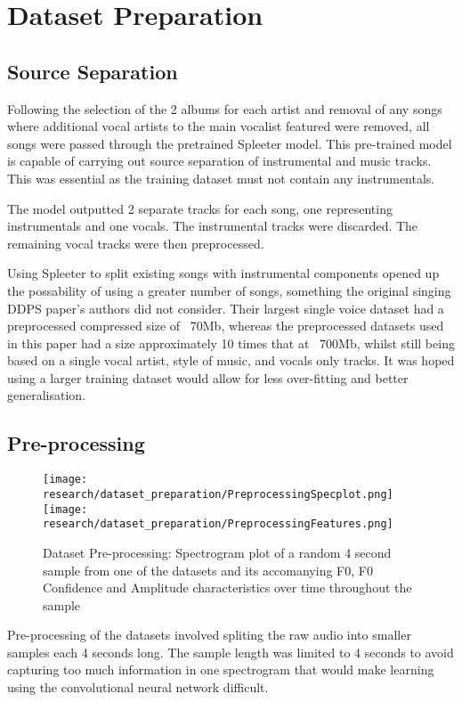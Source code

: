 \section{Dataset Preparation}

\subsection{Source Separation}

Following the selection of the 2 albums for each artist and removal of any songs where additional vocal artists to the main vocalist featured were removed, all songs were passed through the pretrained Spleeter model\cite{SpleeterPip}\cite{SpleeterPip}. This pre-trained model is capable of carrying out source separation of instrumental and music tracks. This was essential as the training dataset must not contain any instrumentals.

The model outputted 2 separate tracks for each song, one representing instrumentals and one vocals. The instrumental tracks were discarded. The remaining vocal tracks were then preprocessed.

Using Spleeter to split existing songs with instrumental components opened up the possability of using a greater number of songs, something the original singing DDPS paper's authors did not consider. Their largest single voice dataset had a preprocessed compressed size of ~70Mb, whereas the preprocessed datasets used in this paper had a size approximately 10 times that at ~700Mb, whilst still being based on a single vocal artist, style of music, and vocals only tracks. It was hoped using a larger training dataset would allow for less over-fitting and better generalisation.

\subsection{Pre-processing}

\begin{figure}
    \centering
    \texttt{[image: research/dataset\_preparation/PreprocessingSpecplot.png]}
    \texttt{[image: research/dataset\_preparation/PreprocessingFeatures.png]}
    \caption{Dataset Pre-processing: Spectrogram plot of a random 4 second sample from one of the datasets and its accomanying F0, F0 Confidence and Amplitude characteristics over time throughout the sample}
\end{figure}

Pre-processing of the datasets involved spliting the raw audio into smaller samples each 4 seconds long. The sample length was limited to 4 seconds to avoid capturing too much information in one spectrogram that would make learning using the convolutional neural network difficult.

